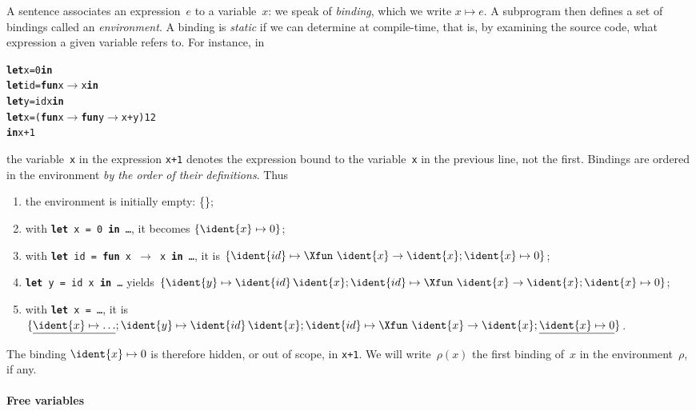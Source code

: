 A sentence associates an expression~\(e\) to a variable~\(x\): we
speak of \emph{binding}, which we write \(x \mapsto e\). A subprogram
then defines a set of bindings called an \emph{environment}. A binding
is \emph{static} if we can determine at compile\hyp{}time, that is, by
examining the source code, what expression a given variable refers
to. For instance, in
\begin{alltt}
\textbf{let} x = 0 \textbf{in}
  \textbf{let} id = \textbf{fun} x \(\rightarrow\) x \textbf{in}
  \textbf{let} y = id x \textbf{in}
  \textbf{let} x = (\textbf{fun} x \(\rightarrow\) \textbf{fun} y \(\rightarrow\) x + y) 1 2
\textbf{in} x+1
\end{alltt}
the variable~\texttt{x} in the expression \texttt{x+1} denotes the
expression bound to the variable~\texttt{x} in the previous line, not
the first. Bindings are ordered in the environment \emph{by the order
of their definitions}. Thus
\begin{enumerate}

  \item the environment is initially empty: \{\};

  \item with \texttt{\textbf{let} x = 0 \textbf{in} \ldots}, it
    becomes $\{\ident{x} \mapsto 0\}$;

  \item with \texttt{\textbf{let} id = \textbf{fun} x $\rightarrow$ x
    \textbf{in} \ldots}, it is
    $\{\ident{id} \mapsto \Xfun \,\, \ident{x} \rightarrow \ident{x}; \ident{x} \mapsto
    0\}$;

  \item \texttt{\textbf{let} y = id x \textbf{in} \ldots} yields
    $\{\ident{y} \mapsto \ident{id} \, \ident{x}; \ident{id} \mapsto \Xfun \,\, \ident{x} \rightarrow \ident{x}; \ident{x} \mapsto
    0\}$;

  \item with \texttt{\textbf{let} x = \ldots}, it is
      $\{\underline{\ident{x} \mapsto \ldots}; \ident{y} \mapsto \ident{id} \, \ident{x}; \ident{id} \mapsto \Xfun \,\, \ident{x} \rightarrow \ident{x}; \underline{\ident{x} \mapsto
      0}\}$.

\end{enumerate}
The binding $\ident{x} \mapsto 0$ is therefore hidden, or out of
scope, in \texttt{x+1}. We will write~\(\rho(x)\) the first binding
of~\(x\) in the environment~\(\rho\), if any.

\paragraph{Free variables}

